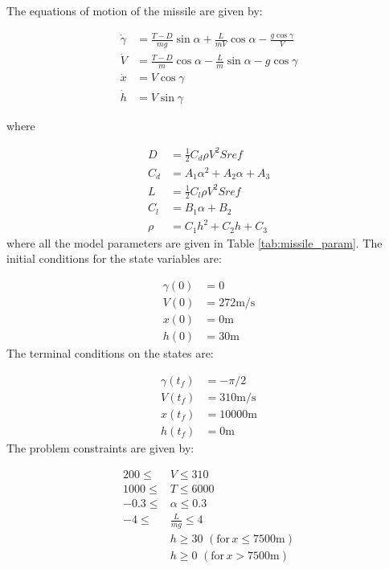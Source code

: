 \documentclass[a4paper,11pt]{report}    %
\begin{document}
The equations of motion of the missile are given by:

\[
 \begin{aligned}
   \dot \gamma & =  \frac{T-D}{mg} \sin \alpha + \frac{L}{mV} \cos \alpha - \frac{g \cos \gamma}{V}\\
   \dot V & = \frac{T-D}{m} \cos \alpha - \frac{L}{m} \sin \alpha - g \cos \gamma \\
   \dot x & = V \cos \gamma \\
   \dot h & = V \sin \gamma 
 \end{aligned}
\]

where

\[
                   \begin{aligned}
                   D &= \frac{1}{2} C_d \rho V^2 Sref \\
                   C_d &= A_1 \alpha^2 + A_2 \alpha + A_3 \\
                   L &= \frac{1}{2} C_l \rho V^2 Sref \\
                   C_l &= B_1 \alpha + B_2 \\
                   \rho &= C_1 h^2 + C_2 h + C_3
                   \end{aligned}
\] 
where all the model parameters are given in Table \ref{tab:missile_param}.
The initial conditions for the state variables are:

\[\begin{aligned}
\gamma(0) &= 0  \\
V(0) &= 272 \mathrm{m/s}  \\
x(0) &= 0 \mathrm{m} \\
h(0) &= 30 \mathrm{m} 
\end{aligned}
\]
The terminal conditions on the states are:

\[ \begin{aligned}
\gamma(t_f) &= -\pi/2  \\
V(t_f) &= 310 \mathrm{m/s}  \\
x(t_f) &= 10000 \mathrm{m} \\
h(t_f) &= 0 \mathrm{m} 
\end{aligned}
\]
The problem constraints are given by:

\[
\begin{aligned}
  200 \le  &V \le 310 \\
  1000 \le  &T \le 6000 \\
  -0.3 \le  &\alpha \le 0.3 \\
  -4 \le & \frac{L}{mg} \le 4\\
  &h \ge 30 \, \,(\mathrm{for} \,  x \le 7500 \mathrm{m}) \\
  &h \ge 0 \, \,(\mathrm{for} \,  x > 7500 \mathrm{m}) \\
\end{aligned}
\]
\end{document}
